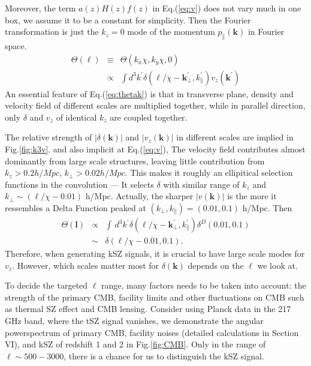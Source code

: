Moreover, the term $a(z)H(z)f(z)$ in Eq.(\ref{eq:v}) does not vary much in one box, we assume it to be a constant for simplicity. 
Then the Fourier transformation is just the $k_z=0$ mode of the momentum 
$p_\parallel(\bm{k})$ in Fourier space. 
\begin{eqnarray}
    \label{eq:thetak}
    \Theta(\bm{\ell})&\equiv&\Theta({k}_x\chi,{k}_y\chi,0)\\
    &\propto&\int 
    d^3k^\prime\delta(\bm{\ell}/\chi-\bm{k}_\perp^\prime,k_\parallel^\prime) v_z(\bm{k^\prime})\nonumber
    \end{eqnarray}
An essential feature of Eq.(\ref{eq:thetak}) is that
in transverse plane, density and velocity field of different scales are multiplied together, 
 while in parallel direction, only $\delta$ and $v_z$ of 
 identical $k_z$ are coupled together.  

The relative strength of $|\delta(\bm{k})|$ and $|v_z(\bm{k})|$ in different scales 
are implied in Fig.\ref{fig:k3v}. 
and also implicit at Eq.(\ref{eq:v}), 
The velocity field contributes almost dominantly from large scale structures, 
leaving little contribution from $k_z>0.2 h/Mpc$, $k_\perp> 0.02 h/Mpc$. 
This makes it roughly an ellipitical selection functions in the convolution
---
It selects $\delta$ with similar range of $k_z$ and $k_\perp\sim(\ell/\chi-0.01)$ h/Mpc.  
Actually, the sharper $|v(\bm{k})|$ is 
the more it ressembles a Delta Function peaked at 
$(k_\perp,k_\parallel)=(0.01,0.1)$ h/Mpc. 
Then 
\begin{eqnarray}
    \Theta(\bm{l}) &\propto& \int\, 
    d^3k^\prime\delta(\bm{\ell}/\chi-\bm{k}_\perp^\prime,k_\parallel^\prime) 
    \delta^D(0.01,0.1) \\
    &\sim& \delta(\ell/\chi-0.01,0.1).
\end{eqnarray}
Therefore, when generating kSZ signals, 
it is crucial to have large scale modes for $v_z$. 
However, which scales matter most for $\delta(\bm{k})$ 
depends on the $\ell$ we look at.  

To decide the targeted $\ell$ range, 
many factors needs to be taken into account:  
the strength of the primary CMB, facility limits and 
other fluctuations on CMB such as thermal SZ effect\cite{} and CMB lensing\cite{}.
Consider using Planck \cite{Planck2015} data 
in the 217 GHz band, where the tSZ signal vanishes, 
we demonstrate the angular powerspectrum of primary CMB, 
facility noises (detailed calculations in Section VI), 
and kSZ of redshift 1 and 2 
in Fig.\ref{fig:CMB}. 
Only in the range of $\ell \sim 500-3000$, 
there is a chance for us to distinguish the kSZ signal.  

